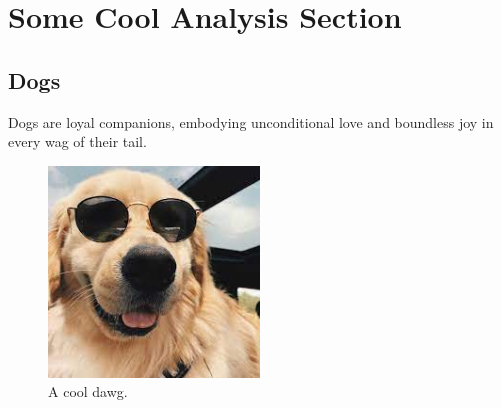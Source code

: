 \section*{Some Cool Analysis Section}
\subsection*{Dogs}
Dogs are loyal companions, embodying unconditional love and boundless joy in every wag of their tail.
\begin{figure}[h!]
    \centering
    \includegraphics[width=0.5\textwidth]{images/dawg.jpg}
    \caption{A cool dawg.}
\end{figure}

